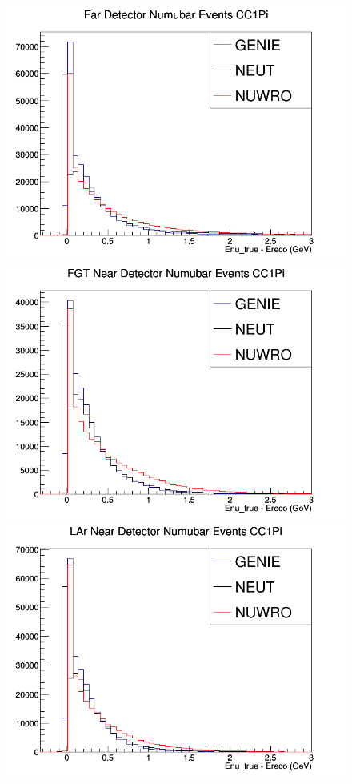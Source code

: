 \documentclass[12pt]{article}
\begin{document}
\begin{figure}[h]
\endminipage
\newline
{}
\includegraphics[width=\linewidth]{Ereco_Etrue/numubar_FD_CC1Pi.png}
\endminipage
{}
\includegraphics[width=\linewidth]{Ereco_Etrue/numubar_FGT_CC1Pi.png}
\endminipage
{}
\includegraphics[width=\linewidth]{Ereco_Etrue/numubar_LAr_CC1Pi.png}

\end{figure}
\end{document}

